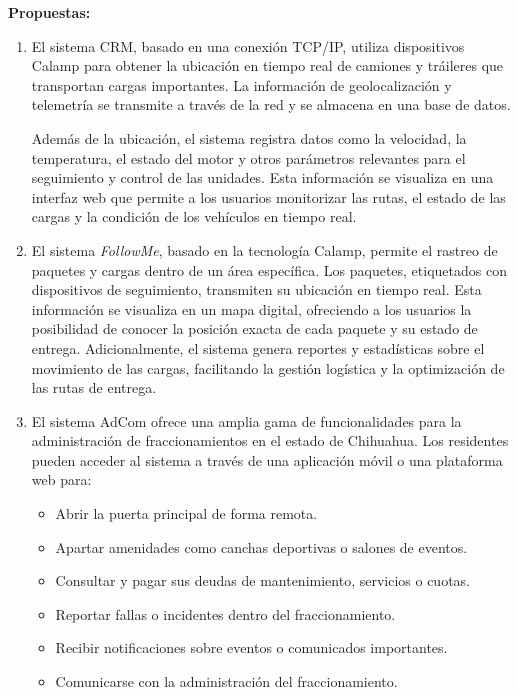 \documentclass[protocolo.tex]{subfiles}
\begin{document}
\textbf{Propuestas:}
\begin{enumerate}
\item El sistema CRM, basado en una conexión TCP/IP, utiliza dispositivos Calamp para obtener la ubicación en tiempo real de camiones y tráileres que transportan cargas importantes. La información de geolocalización y telemetría se transmite a través de la red y se almacena en una base de datos.

Además de la ubicación, el sistema registra datos como la velocidad, la temperatura, el estado del motor y otros parámetros relevantes para el seguimiento y control de las unidades. Esta información se visualiza en una interfaz web que permite a los usuarios monitorizar las rutas, el estado de las cargas y la condición de los vehículos en tiempo real.

\item El sistema \textit{FollowMe}, basado en la tecnología Calamp, permite el rastreo de paquetes y cargas dentro de un área específica. Los paquetes, etiquetados con dispositivos de seguimiento, transmiten su ubicación en tiempo real. Esta información se visualiza en un mapa digital,  ofreciendo a los usuarios la posibilidad de conocer la posición exacta de cada paquete y su estado de entrega. Adicionalmente, el sistema genera reportes y estadísticas sobre el movimiento de las cargas, facilitando la gestión logística y la optimización de las rutas de entrega.

\item El sistema AdCom ofrece una amplia gama de funcionalidades para la  administración  de  fraccionamientos  en  el  estado  de  Chihuahua.  Los  residentes  pueden  acceder  al  sistema  a  través  de  una  aplicación  móvil  o  una  plataforma  web  para:

\begin{itemize}
\item Abrir la puerta principal de forma remota.
\item Apartar amenidades como canchas deportivas o salones de eventos.
\item Consultar y pagar sus deudas de mantenimiento, servicios o cuotas.
\item Reportar fallas o incidentes dentro del fraccionamiento.
\item Recibir notificaciones sobre eventos o comunicados importantes.
\item Comunicarse con la administración del fraccionamiento.
\end{itemize}
\end{enumerate}
\end{document}
